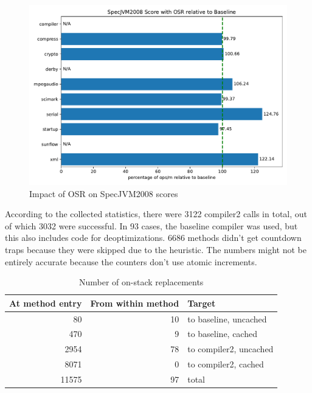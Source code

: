 \documentclass[draft,final]{vutinfth} %
\begin{document}
    \begin{figure}
        \centering
        \includegraphics[width=\textwidth]{../evaluation/specjvm/plots/plot_normalized_grouped}
        \caption{Impact of OSR on SpecJVM2008 scores}
        \label{fig:spec-relative}
    \end{figure}

    According to the collected statistics,
    there were 3122 compiler2 calls in total,
    out of which 3032 were successful.
    In 93 cases, the baseline compiler was used,
    but this also includes code for deoptimizations.
    6686 methods didn't get countdown traps
    because they were skipped due to the heuristic.
    The numbers might not be entirely accurate
    because the counters don't use atomic increments.


    \begin{table}
        \centering
        \begin{tabular}{rrl}
            \toprule
            \textbf{At method entry} & \textbf{From within method} & \textbf{Target}        \\
            \midrule
            80                       & 10                          & to baseline, uncached  \\
            470                      & 9                           & to baseline, cached    \\
            \midrule
            2954                     & 78                          & to compiler2, uncached \\
            8071                     & 0                           & to compiler2, cached   \\
            \midrule
            11575                    & 97                          & total                  \\
            \bottomrule
        \end{tabular}
        \caption{Number of on-stack replacements}
        \label{tab:osr-counts}
    \end{table}
\end{document}
